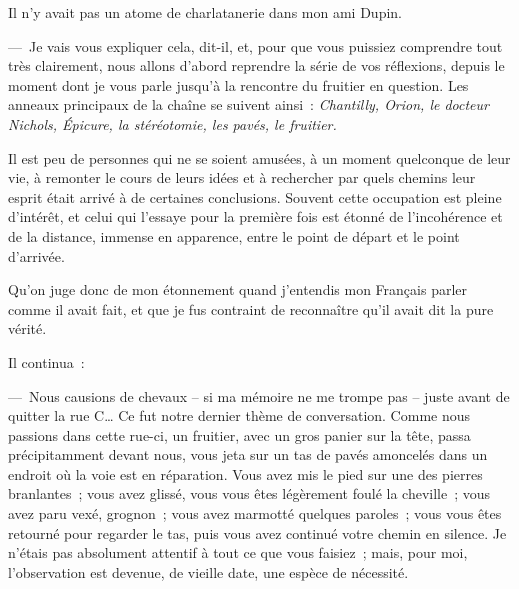 \documentclass[french,twoside]{book} %
\begin{document}
Il n’y avait pas un atome de charlatanerie dans mon ami Dupin.\par
— Je vais vous expliquer cela, dit-il, et, pour que vous puissiez comprendre tout très clairement, nous allons d’abord reprendre la série de vos réflexions, depuis le moment dont je vous parle jusqu’à la rencontre du fruitier en question. Les anneaux principaux de la chaîne se suivent ainsi : \emph{Chantilly, Orion, le docteur Nichols, Épicure, la stéréotomie, les pavés, le fruitier.}\par
Il est peu de personnes qui ne se soient amusées, à un moment quelconque de leur vie, à remonter le cours de leurs idées et à rechercher par quels chemins leur esprit était arrivé à de certaines conclusions. Souvent cette occupation est pleine d’intérêt, et celui qui l’essaye pour la première fois est étonné de l’incohérence et de la distance, immense en apparence, entre le point de départ et le point d’arrivée.\par
Qu’on juge donc de mon étonnement quand j’entendis mon Français parler comme il avait fait, et que je fus contraint de reconnaître qu’il avait dit la pure vérité.\par
Il continua :\par
— Nous causions de chevaux – si ma mémoire ne me trompe pas – juste avant de quitter la rue C… Ce fut notre dernier thème de conversation. Comme nous passions dans cette rue-ci, un fruitier, avec un gros panier sur la tête, passa précipitamment devant nous, vous jeta sur un tas de pavés amoncelés dans un endroit où la voie est en réparation. Vous avez mis le pied sur une des pierres branlantes ; vous avez glissé, vous vous êtes légèrement foulé la cheville ; vous avez paru vexé, grognon ; vous avez marmotté quelques paroles ; vous vous êtes retourné pour regarder le tas, puis vous avez continué votre chemin en silence. Je n’étais pas absolument attentif à tout ce que vous faisiez ; mais, pour moi, l’observation est devenue, de vieille date, une espèce de nécessité.\par
\end{document}
